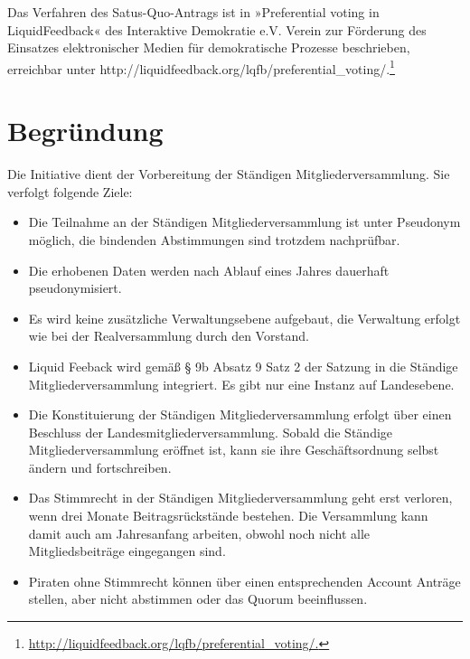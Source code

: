Das Verfahren des Satus-Quo-Antrags ist in »Preferential voting in LiquidFeedback« des Interaktive Demokratie e.V. Verein zur Förderung des Einsatzes elektronischer Medien für demokratische Prozesse beschrieben, erreichbar unter http://liquidfeedback.org/lqfb/preferential\_voting/.\footnote{\url{http://liquidfeedback.org/lqfb/preferential\_voting/.}}

\section{Begründung}

Die Initiative dient der Vorbereitung der Ständigen Mitgliederversammlung. Sie verfolgt folgende Ziele:

\begin{itemize}
\item
  Die Teilnahme an der Ständigen Mitgliederversammlung ist unter Pseudonym möglich, die bindenden Abstimmungen sind trotzdem nachprüfbar.
\item
  Die erhobenen Daten werden nach Ablauf eines Jahres dauerhaft pseudonymisiert.
\item
  Es wird keine zusätzliche Verwaltungsebene aufgebaut, die Verwaltung erfolgt wie bei der Realversammlung durch den Vorstand.
\item
  Liquid Feeback wird gemäß § 9b Absatz 9 Satz 2 der Satzung in die Ständige Mitgliederversammlung integriert. Es gibt nur eine Instanz auf Landesebene.
\item
  Die Konstituierung der Ständigen Mitgliederversammlung erfolgt über einen Beschluss der Landesmitgliederversammlung. Sobald die Ständige Mitgliederversammlung eröffnet ist, kann sie ihre Geschäftsordnung selbst ändern und fortschreiben.
\item
  Das Stimmrecht in der Ständigen Mitgliederversammlung geht erst verloren, wenn drei Monate Beitragsrückstände bestehen. Die Versammlung kann damit auch am Jahresanfang arbeiten, obwohl noch nicht alle Mitgliedsbeiträge eingegangen sind.
\item
  Piraten ohne Stimmrecht können über einen entsprechenden Account Anträge stellen, aber nicht abstimmen oder das Quorum beeinflussen.
\end{itemize}
